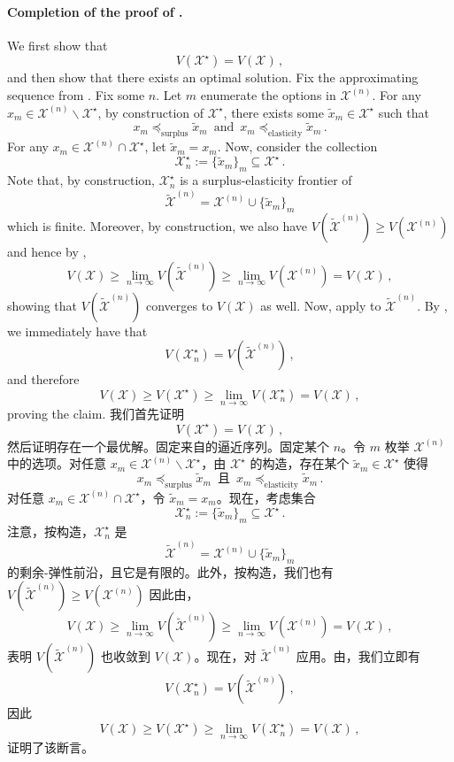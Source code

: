\documentclass[12pt,letterpaper]{article}
\newenvironment{original}{\color{black}\noindent}{}
\newenvironment{translation}{\color{blue}\noindent}{}
\theoremstyle{plain}
\theoremstyle{definition}
\theoremstyle{remark}
\renewcommand{\1}{\mathds{1}}
\newcommand{\X}{\mathcal{X}}
\theoremstyle{definition}
\begin{document}
\paragraph{Completion of the proof of .}\hspace{-2mm}\begin{original}We first show that
\[V(\X^\star) = V(\X)\,,\]
and then show that there exists an optimal solution. Fix the approximating sequence from . Fix some $n$. Let $m$ enumerate the options in $\X^{(n)}$. For any $x_m \in \X^{(n)} \backslash \X^\star$, by construction of $\X^\star$, there exists some $\tilde{x}_m \in \X^\star$ such that
\[x_m \preceq_{\text{surplus}} \tilde{x}_m \,\text{ and }\, x_m \preceq_{\text{elasticity}} \tilde{x}_m\,.\]
For any $x_m \in \X^{(n)} \cap \X^\star$, let $\tilde{x}_m = x_m$. Now, consider the collection
\[\X^\star_n := \{\tilde{x}_m\}_m \subseteq \X^\star\,.\]
Note that, by construction, $\X^\star_n$ is a surplus-elasticity frontier of
\[\tilde{\X}^{(n)}= \X^{(n)} \cup \{\tilde{x}_m\}_m\]
which is finite. Moreover, by construction, we also have
$V(\tilde{\X}^{(n)}) \geq V(\X^{(n)}) $
and hence by ,
\[V(\X) \geq \displaystyle\lim_{n\rightarrow \infty}V(\tilde{\X}^{(n)}) \geq \displaystyle\lim_{n\rightarrow \infty}V(\X^{(n)}) = V(\X)\,,\]
showing that $V(\tilde{\X}^{(n)})$ converges to $V(\X)$ as well. Now, apply  to  $\tilde{\X}^{(n)}$. By , we immediately have that
\[V(\X^\star_n) = V(\tilde{\X}^{(n)})\,,\]
and therefore
\[ V(\X) \geq V(\X^\star) \geq \lim_{n\rightarrow \infty}V(\X^\star_n) = V(\X)\,, \]
proving the claim.
\end{original}
\begin{translation}
我们首先证明
\[V(\X^\star) = V(\X)\,,\]
然后证明存在一个最优解。固定来自的逼近序列。固定某个 $n$。令 $m$ 枚举 $\X^{(n)}$ 中的选项。对任意 $x_m \in \X^{(n)} \backslash \X^\star$，由 $\X^\star$ 的构造，存在某个 $\tilde{x}_m \in \X^\star$ 使得
\[x_m \preceq_{\text{surplus}} \tilde{x}_m \,\text{ 且 }\, x_m \preceq_{\text{elasticity}} \tilde{x}_m\,.\]
对任意 $x_m \in \X^{(n)} \cap \X^\star$，令 $\tilde{x}_m = x_m$。现在，考虑集合
\[\X^\star_n := \{\tilde{x}_m\}_m \subseteq \X^\star\,.\]
注意，按构造，$\X^\star_n$ 是
\[\tilde{\X}^{(n)}= \X^{(n)} \cup \{\tilde{x}_m\}_m\]
的剩余-弹性前沿，且它是有限的。此外，按构造，我们也有
$V(\tilde{\X}^{(n)}) \geq V(\X^{(n)})$
因此由，
\[V(\X) \geq \displaystyle\lim_{n\rightarrow \infty}V(\tilde{\X}^{(n)}) \geq \displaystyle\lim_{n\rightarrow \infty}V(\X^{(n)}) = V(\X)\,,\]
表明 $V(\tilde{\X}^{(n)})$ 也收敛到 $V(\X)$。现在，对 $\tilde{\X}^{(n)}$ 应用。由，我们立即有
\[V(\X^\star_n) = V(\tilde{\X}^{(n)})\,,\]
因此
\[ V(\X) \geq V(\X^\star) \geq \lim_{n\rightarrow \infty}V(\X^\star_n) = V(\X)\,, \]
证明了该断言。
\end{translation}
\end{document}
